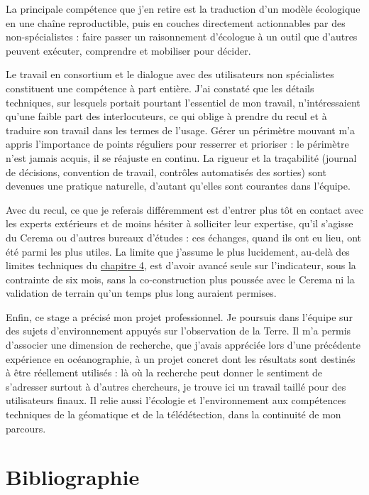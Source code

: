 \documentclass[a4paper,11pt]{report}
\begin{document}
La principale compétence que j'en retire est la traduction d'un modèle écologique en une chaîne reproductible, puis en couches directement actionnables par des non-spécialistes : faire passer un raisonnement d'écologue à un outil que d'autres peuvent exécuter, comprendre et mobiliser pour décider.

Le travail en consortium et le dialogue avec des utilisateurs non spécialistes constituent une compétence à part entière. J'ai constaté que les détails techniques, sur lesquels portait pourtant l'essentiel de mon travail, n'intéressaient qu'une faible part des interlocuteurs, ce qui oblige à prendre du recul et à traduire son travail dans les termes de l'usage. Gérer un périmètre mouvant m'a appris l'importance de points réguliers pour resserrer et prioriser : le périmètre n'est jamais acquis, il se réajuste en continu. La rigueur et la traçabilité (journal de décisions, convention de travail, contrôles automatisés des sorties) sont devenues une pratique naturelle, d'autant qu'elles sont courantes dans l'équipe.

Avec du recul, ce que je referais différemment est d'entrer plus tôt en contact avec les experts extérieurs et de moins hésiter à solliciter leur expertise, qu'il s'agisse du Cerema ou d'autres bureaux d'études : ces échanges, quand ils ont eu lieu, ont été parmi les plus utiles. La limite que j'assume le plus lucidement, au-delà des limites techniques du \hyperref[chap:4]{chapitre 4}, est d'avoir avancé seule sur l'indicateur, sous la contrainte de six mois, sans la co-construction plus poussée avec le Cerema ni la validation de terrain qu'un temps plus long auraient permises.

Enfin, ce stage a précisé mon projet professionnel. Je poursuis dans l'équipe sur des sujets d'environnement appuyés sur l'observation de la Terre. Il m'a permis d'associer une dimension de recherche, que j'avais appréciée lors d'une précédente expérience en océanographie, à un projet concret dont les résultats sont destinés à être réellement utilisés : là où la recherche peut donner le sentiment de s'adresser surtout à d'autres chercheurs, je trouve ici un travail taillé pour des utilisateurs finaux. Il relie aussi l'écologie et l'environnement aux compétences techniques de la géomatique et de la télédétection, dans la continuité de mon parcours.

\chapter*{Bibliographie}
\label{sec:bibliographie}
\end{document}
